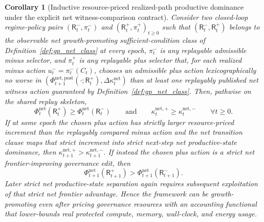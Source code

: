 \documentclass[11pt]{article}
\newtheorem{corollary}[theorem]{Corollary}
\theoremstyle{definition}
\newcommand{\1}{\mathbf{1}}
\begin{document}
\begin{corollary}[Inductive resource-priced realized-path productive dominance under the explicit net witness-comparison contract]\label{cor:net_realized_growth}
Consider two closed-loop regime-policy pairs $(\mathsf R_t^-,\pi_t^-)$ and $(\mathsf R_t^+,\pi_t^+)_{t\ge 0}$ such that $(\mathsf R_t^-,\mathsf R_t^+)$ belongs to the observable net growth-promoting sufficient-condition class of Definition~\ref{def:gp_net_class} at every epoch, $\pi_t^-$ is any replayable admissible minus selector, and $\pi_t^+$ is any replayable plus selector that, for each realized minus action $u_t^-=\pi_t^-(C_t)$, chooses an admissible plus action lexicographically no worse in $(\Phi_{t+1}^{\mathrm{net,post}}(\cdot;\mathsf R_t^+),\Delta\kappa_t^{\mathrm{net}})$ than at least one replayably published net witness action guaranteed by Definition~\ref{def:gp_net_class}. Then, pathwise on the shared replay skeleton,
\[
\Phi_t^{\mathrm{net}}(\mathsf R_t^+)\ge \Phi_t^{\mathrm{net}}(\mathsf R_t^-)\qquad\text{and}\qquad\kappa_t^{\mathrm{net},+}\ge \kappa_t^{\mathrm{net},-}\qquad \forall t\ge 0.
\]
If at some epoch the chosen plus action has strictly larger resource-priced increment than the replayably compared minus action and the net transition clause maps that strict increment into strict next-step net productive-state dominance, then $\kappa_{t+1}^{\mathrm{net},+}>\kappa_{t+1}^{\mathrm{net},-}$. If instead the chosen plus action is a strict net frontier-improving governance edit, then
\[
\Phi_{t+1}^{\mathrm{net}}(\mathsf R_{t+1}^+)>\Phi_{t+1}^{\mathrm{net}}(\mathsf R_{t+1}^-).
\]
Later strict net productive-state separation again requires subsequent exploitation of that strict net frontier advantage. Hence the framework can be growth-promoting even after pricing governance resources with an accounting functional that lower-bounds real protected compute, memory, wall-clock, and energy usage.
\end{corollary}
\end{document}
